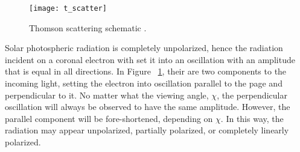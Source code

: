 \begin{figure}[!t]
\begin{center}
\texttt{[image: t\_scatter]}
\caption[Thomson scattering schematic.]{Thomson scattering schematic \citep{howtap2009}.}
\label{fig:tscatter}
\end{center}
\end{figure}
Solar photospheric radiation is completely unpolarized, hence the radiation incident on a coronal electron with set it into an oscillation with an amplitude that is equal in all directions. In Figure ~\ref{fig:tscatter}, their are two components to the incoming light, setting the electron into oscillation parallel to the page and perpendicular to it. No matter what the viewing angle, $\chi$, the perpendicular oscillation will always be observed to have the same amplitude. However, the parallel component will be fore-shortened, depending on $\chi$. In this way, the radiation may appear unpolarized, partially polarized, or completely linearly polarized.

